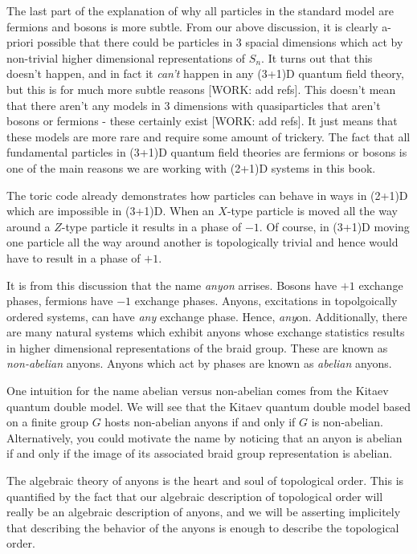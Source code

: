 \documentclass{article}
\theoremstyle{definition}
\numberwithin{figure}{section}
\begin{document}
The last part of the explanation of why all particles in the standard model are fermions and bosons is more subtle. From our above discussion, it is clearly a-priori possible that there could be particles in 3 spacial dimensions which act by non-trivial higher dimensional representations of $S_n$. It turns out that this doesn't happen, and in fact it \textit{can't} happen in any (3+1)D quantum field theory, but this is for much more subtle reasons [WORK: add refs]. This doesn't mean that there aren't any models in 3 dimensions with quasiparticles that aren't bosons or fermions - these certainly exist [WORK: add refs]. It just means that these models are more rare and require some amount of trickery. The fact that all fundamental particles in (3+1)D quantum field theories are fermions or bosons is one of the main reasons we are working with (2+1)D systems in this book.

The toric code already demonstrates how particles can behave in ways in (2+1)D which are impossible in (3+1)D. When an $X$-type particle is moved all the way around a $Z$-type particle it results in a phase of $-1$. Of course, in (3+1)D moving one particle all the way around another is topologically trivial and hence would have to result in a phase of $+1$.

It is from this discussion that the name \textit{anyon} arrises. Bosons have $+1$ exchange phases, fermions have $-1$ exchange phases. Anyons, excitations in topolgoically ordered systems, can have \textit{any} exchange phase. Hence, \textit{any}on. Additionally, there are many natural systems which exhibit anyons whose exchange statistics results in higher dimensional representations of the braid group. These are known as \textit{non-abelian} anyons. Anyons which act by phases are known as \textit{abelian} anyons.

One intuition for the name abelian versus non-abelian comes from the Kitaev quantum double model. We will see that the Kitaev quantum double model based on a finite group $G$ hosts non-abelian anyons if and only if $G$ is non-abelian. Alternatively, you could motivate the name by noticing that an anyon is abelian if and only if the image of its associated braid group representation is abelian.

The algebraic theory of anyons is the heart and soul of topological order. This is quantified by the fact that our algebraic description of topological order will really be an algebraic description of anyons, and we will be asserting implicitely that describing the behavior of the anyons is enough to describe the topological order.
\end{document}
